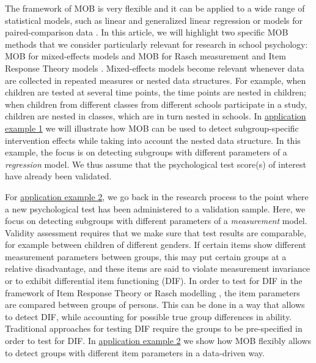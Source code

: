 \documentclass[doc,floatsintext,natbib]{apa7}
\begin{document}
The framework of MOB is very flexible and it can be applied to a wide range of statistical models, such as linear and generalized linear regression \citep{KopAugStr:2013,ZeilyHoth08} or models for paired-comparison data \citep{StrWicZei:2011:JoEaBS,WiedyFrick21}. In this article, we will highlight two specific MOB methods that we consider particularly relevant for research in school psychology: MOB for mixed-effects models \citep{FokkySmit18} and MOB for Rasch measurement and Item Response Theory models \citep[IRT,][]{StrKopZei:2015:P,KomStrZei:2017:EaPM,HenDebStr:2023:EPM}. Mixed-effects models become relevant whenever data are collected in repeated measures or nested data structures. For example, when children are tested at several time points, the time points are nested in children; when children from different classes from different schools participate in a study, children are nested in classes, which are in turn nested in schools. In \hyperref[sec:TutorialMixed]{application example 1} we will illustrate how MOB can be used to detect subgroup-specific intervention effects while taking into account the nested data structure. In this example, the focus is on detecting subgroups with different parameters of a \textit{regression} model. We thus assume that the psychological test score(s) of interest have already been validated. 


For \hyperref[sec:TutorialRasch]{application example 2}, we go back in the research process to the point where a new psychological test has been administered to a validation sample. Here, we focus on detecting subgroups with different parameters of a \textit{measurement} model. Validity assessment requires that we make sure that test results are comparable, for example between children of different genders. If certain items show different measurement parameters between groups, this may put certain groups at a relative disadvantage, and these items are said to violate measurement invariance or to exhibit differential item functioning (DIF). In order to test for DIF in the framework of Item Response Theory or Rasch modelling \citep{AnthyDiPe16,DebStrZei:2022:CRC,Mall97}, the item parameters are compared between groups of persons. This can be done in a way that allows to detect DIF, while accounting for possible true group differences in ability. Traditional approaches for testing DIF require the groups to be pre-specified in order to test for DIF. In \hyperref[sec:TutorialRasch]{application example 2} we show how MOB flexibly allows to detect groups with different item parameters in a data-driven way. 
\end{document}
